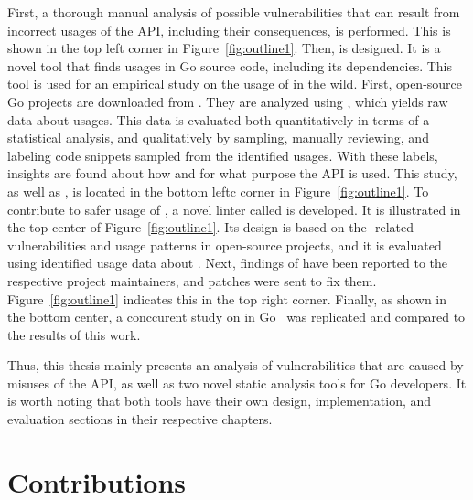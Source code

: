 

First, a thorough manual analysis of possible vulnerabilities that can result from incorrect usages of the \unsafe{}
\acrshort{API}, including their consequences, is performed.
This is shown in the top left corner in Figure~\ref{fig:outline1}.
Then, \toolGeiger{} is designed.
It is a novel tool that finds \unsafe{} usages in Go source code, including its dependencies.
This tool is used for an empirical study on the usage of \unsafe{} in the wild.
First, open-source Go projects are downloaded from \github{}.
They are analyzed using \toolGeiger{}, which yields raw data about \unsafe{} usages.
This data is evaluated both quantitatively in terms of a statistical analysis, and qualitatively by sampling,
manually reviewing, and labeling code snippets sampled from the identified \unsafe{} usages.
With these labels, insights are found about how and for what purpose the \unsafe{} \acrshort{API} is used.
This study, as well as \toolGeiger{}, is located in the bottom leftc corner in Figure~\ref{fig:outline1}.
To contribute to safer usage of \unsafe{}, a novel linter called \toolSafer{} is developed.
It is illustrated in the top center of Figure~\ref{fig:outline1}.
Its design is based on the \unsafe{}-related vulnerabilities and \unsafe{} usage patterns in open-source projects,
and it is evaluated using identified usage data about \unsafe{}.
Next, findings of \toolSafer{} have been reported to the respective project maintainers, and patches were sent to fix
them.
Figure~\ref{fig:outline1} indicates this in the top right corner.
Finally, as shown in the bottom center, a conccurent study on \unsafe{} in Go~\cite{costa2020} was replicated and
compared to the results of this work.

Thus, this thesis mainly presents an analysis of vulnerabilities that are caused by misuses of the \unsafe{}
\acrshort{API}, as well as two novel static analysis tools for Go developers.
It is worth noting that both tools have their own design, implementation, and evaluation sections in their respective
chapters.



\section{Contributions}\label{sec:introduction:contributions}

